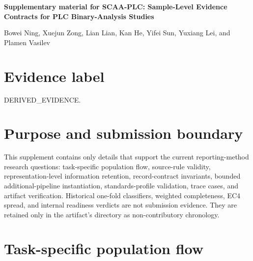 \documentclass[a4paper,fleqn]{cas-dc}
\begin{document}
\let\WriteBookmarks\relax
\def\floatpagepagefraction{0.8}
\def\textpagefraction{0.08}

\renewcommand{\thefigure}{S\arabic{figure}}
\renewcommand{\thetable}{S\arabic{table}}
\renewcommand{\theequation}{S\arabic{equation}}

\onecolumn
\begin{center}
{\Large\bfseries Supplementary material for SCAA-PLC: Sample-Level Evidence Contracts for PLC Binary-Analysis Studies\par}
\vspace{0.6em}
{\normalsize Bowei Ning, Xuejun Zong, Lian Lian, Kan He, Yifei Sun, Yuxiang Lei, and Plamen Vasilev\par}
\vspace{0.8em}
\end{center}

\section*{Evidence label}

DERIVED\_EVIDENCE.

\section{Purpose and submission boundary}

This supplement contains only details that support the current reporting-method research questions: task-specific population flow, source-rule validity, representation-level information retention, record-contract invariants, bounded additional-pipeline instantiation, standards-profile validation, trace cases, and artifact verification. Historical one-fold classifiers, weighted completeness, EC4 spread, and internal readiness verdicts are not submission evidence. They are retained only in the artifact's  directory as non-contributory chronology.

\section{Task-specific population flow}
\end{document}
